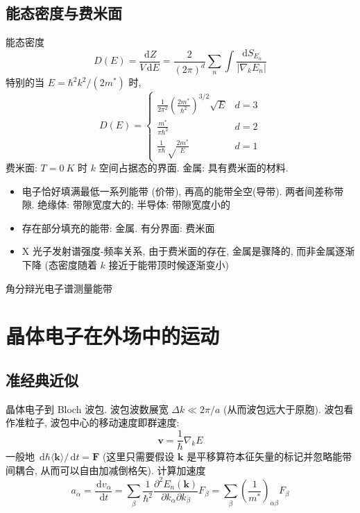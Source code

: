 \documentclass[11pt,a4paper]{article}%
\numberwithin{equation}{section}%
\renewcommand*{\vec}[1]{\bm{#1}}%
\newcommand{\dif}{\,\mathrm d}
\begin{document}
\subsection{能态密度与费米面} %
\label{sub:density_of_state}
能态密度
\begin{equation}
	D(E) = \frac{\dif Z}{V\dif E} = \frac{2}{(2\pi)^d}\sum_n\int\frac{\dif S_{E_n}}{|\nabla_k E_n|}
\end{equation}
特别的当 $E = \hbar^2k^2/(2m^*)$ 时, 
\begin{equation}
	D(E) = \begin{cases}
		\frac 1{2\pi^2}\left(\frac{2m^*}{\hbar^2}\right)^{3/2}\sqrt E & d=3 \\
		\frac{m^*}{\pi\hbar^2} & d=2 \\
		\frac 1{\pi\hbar}\sqrt\frac{2m^*}{E} & d=1
	\end{cases}
\end{equation}
费米面: $T = \SI{0}{K}$ 时 $k$ 空间占据态的界面. 金属: 具有费米面的材料.
\begin{itemize}
	\item 电子恰好填满最低一系列能带 (价带), 再高的能带全空(导带). 两者间差称带隙. 绝缘体: 带隙宽度大的; 半导体: 带隙宽度小的
	\item 存在部分填充的能带: 金属. 有分界面: 费米面
	\item X 光子发射谱强度-频率关系, 由于费米面的存在, 金属是骤降的, 而非金属逐渐下降 (态密度随着 $k$ 接近于能带顶时候逐渐变小)
\end{itemize}
角分辩光电子谱测量能带
\section{晶体电子在外场中的运动} %
\label{sec:e_in_outer_field}
\subsection{准经典近似} %
\label{sub:semi_classic}
晶体电子到 Bloch 波包. 波包波数展宽 $\Delta k \ll 2\pi / a$ (从而波包远大于原胞). 波包看作准粒子, 波包中心的移动速度即群速度:
\begin{equation}
	\vec v = \frac 1\hbar \nabla_k E
\end{equation}
一般地 $\dif \hbar \langle\vec k\rangle/\dif t = \vec F$ (这里只需要假设 $\vec k$ 是平移算符本征矢量的标记并忽略能带间耦合, 从而可以自由加减倒格矢). 计算加速度
\begin{equation}
	a_\alpha = \frac{\dif v_\alpha}{\dif t} = \sum_\beta \frac 1{\hbar^2}\frac{\partial^2 E_n(\vec k)}{\partial k_\alpha\partial k_\beta} F_\beta = \sum_\beta \left(\frac 1{m^*}\right)_{\alpha\beta}F_\beta
\end{equation}
\end{document}
